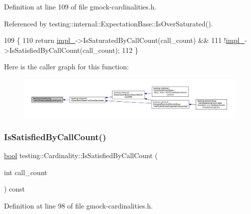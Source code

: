 Definition at line 109 of file gmock-\/cardinalities.\+h.



Referenced by testing\+::internal\+::\+Expectation\+Base\+::\+Is\+Over\+Saturated().


\begin{DoxyCode}
109                                                         \{
110     \textcolor{keywordflow}{return} \hyperlink{classtesting_1_1Cardinality_ae8c43c635af16756d535b491ccf19c2f}{impl\_}->IsSaturatedByCallCount(call\_count) &&
111         !\hyperlink{classtesting_1_1Cardinality_ae8c43c635af16756d535b491ccf19c2f}{impl\_}->IsSatisfiedByCallCount(call\_count);
112   \}
\end{DoxyCode}
Here is the caller graph for this function\+:
\nopagebreak
\begin{figure}[H]
\begin{center}
\leavevmode
\includegraphics[width=350pt]{classtesting_1_1Cardinality_a9b6a55179f6dcc8fadec26e6d93f3e88_icgraph}
\end{center}
\end{figure}
\mbox{\label{classtesting_1_1Cardinality_a6c5e2bd2887ff06e20e6fcc4255a0c1c}} 
\subsubsection{\texorpdfstring{Is\+Satisfied\+By\+Call\+Count()}{IsSatisfiedByCallCount()}}
{\footnotesize\ttfamily \hyperlink{classbool}{bool} testing\+::\+Cardinality\+::\+Is\+Satisfied\+By\+Call\+Count (\begin{DoxyParamCaption}\item[{int}]{call\+\_\+count }\end{DoxyParamCaption}) const\hspace{0.3cm}{\ttfamily [inline]}}



Definition at line 98 of file gmock-\/cardinalities.\+h.




